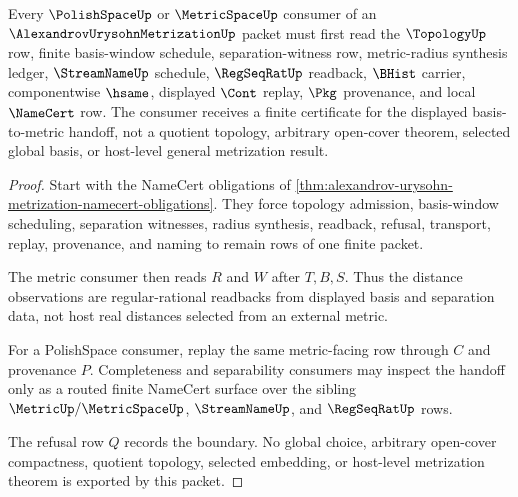 \begin{theorem}
\label{thm:alexandrov-urysohn-finite-basis-to-metric-route}
Every $\PolishSpaceUp$ or $\MetricSpaceUp$ consumer of an $\AlexandrovUrysohnMetrizationUp$ packet must first read the $\TopologyUp$ row, finite basis-window schedule, separation-witness row, metric-radius synthesis ledger, $\StreamNameUp$ schedule, $\RegSeqRatUp$ readback, $\BHist$ carrier, componentwise $\hsame$, displayed $\Cont$ replay, $\Pkg$ provenance, and local $\NameCert$ row. The consumer receives a finite certificate for the displayed basis-to-metric handoff, not a quotient topology, arbitrary open-cover theorem, selected global basis, or host-level general metrization result.
\end{theorem}
\begin{proof}
Start with the NameCert obligations of \autoref{thm:alexandrov-urysohn-metrization-namecert-obligations}. They force topology admission, basis-window scheduling, separation witnesses, radius synthesis, readback, refusal, transport, replay, provenance, and naming to remain rows of one finite packet.

The metric consumer then reads $R$ and $W$ after $T,B,S$. Thus the distance observations are regular-rational readbacks from displayed basis and separation data, not host real distances selected from an external metric.

For a PolishSpace consumer, replay the same metric-facing row through $C$ and provenance $P$. Completeness and separability consumers may inspect the handoff only as a routed finite NameCert surface over the sibling $\MetricUp/\MetricSpaceUp$, $\StreamNameUp$, and $\RegSeqRatUp$ rows.

The refusal row $Q$ records the boundary. No global choice, arbitrary open-cover compactness, quotient topology, selected embedding, or host-level metrization theorem is exported by this packet.
\end{proof}



